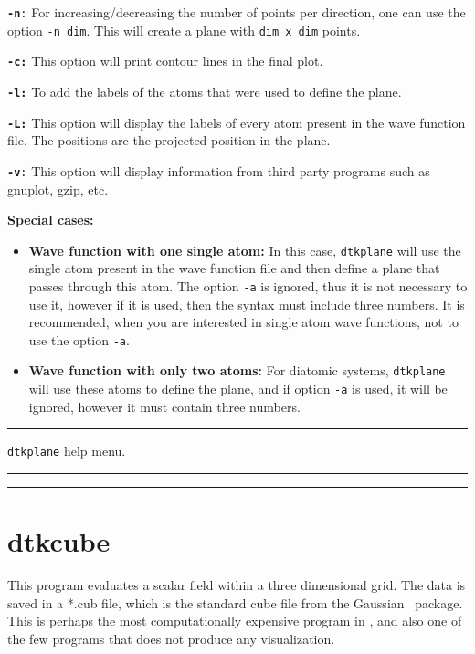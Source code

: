 \texttt{\textbf{-n}:} For increasing/decreasing the number of points per direction, one can use the option \texttt{-n dim}. This will create a plane with \texttt{dim x dim} points.

\texttt{\textbf{-c:}} This option will print contour lines in the final plot.

\texttt{\textbf{-l:}} To add the labels of the atoms that were used to define the plane.

\texttt{\textbf{-L:}} This option will display the labels of every atom present in the wave function file. The positions are the projected position in the plane.

\texttt{\textbf{-v}:} This option will display information from third party programs such as gnuplot, gzip, etc.

\textbf{Special cases:}
\begin{itemize}
   \item \textbf{Wave function with one single atom:} In this case, \texttt{dtkplane} will use the single atom present in the wave function file and then define a plane that passes through this atom. The option \texttt{-a} is ignored, thus it is not necessary to use it, however if it is used, then the syntax must include three numbers. It is recommended, when you are interested in single atom wave functions, not to use the option \texttt{-a}.
   \item \textbf{Wave function with only two atoms:} For diatomic systems, \texttt{dtkplane} will use these atoms to define the plane, and if option \texttt{-a} is used, it will be ignored, however it must contain three numbers.
\end{itemize}

\rule{\textwidth}{1pt}
{\center\texttt{dtkplane} help menu.\\}
\rule{\textwidth}{1pt}
\begin{footnotesize}
\end{footnotesize}
\rule{\textwidth}{1pt}
\section{dtkcube}

This program evaluates a scalar field within a three dimensional grid. The data is saved in a *.cub file, which is the standard cube file from the Gaussian~\cite{bib:gaussian09} package. This is perhaps the most computationally expensive program in \DTK{}, and also one of the few programs that does not produce any visualization.

